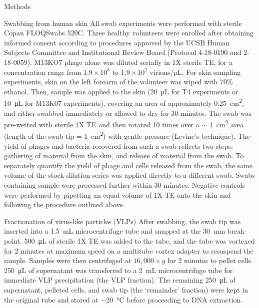 \documentclass[oneside,12pt,final]{sty/ucthesis-CA2012}
\begin{document}
\begin{mainmatter}
\begin{section}{Methods}
\begin{subsection}{Swabbing from human skin}
All swab experiments were performed with sterile Copan FLOQSwabs 520C. Three healthy volunteers were enrolled after obtaining informed consent according to procedures approved by the UCSB Human Subjects Committee and Institutional Review Board (Protocol 4-18-0190 and 2-18-0059). M13KO7 phage alone was diluted serially in 1X sterile TE, for a concentration range from $1.9 \times 10^{8}$ to $1.9 \times 10^{2}$ virions/$\si{\micro\liter}$. For skin sampling experiments, skin on the left forearm of the volunteer was wiped with 70\% ethanol. Then, sample was applied to the skin (\SI{20}{\micro\liter} for T4 experiments or \SI{10} {\micro\liter} for M13K07 experiments), covering an area of approximately \SI{0.25}{\centi\meter\squared}, and either swabbed immediately or allowed to dry for 30 minutes. The swab was pre-wetted with sterile 1X TE and then rotated 10 times over a $\sim$ \SI{1}{\centi\meter\squared} area (length of the swab tip = \SI{1}{\centi\meter\squared}) with gentle pressure (Levine’s technique). The yield of phages and bacteria recovered from such a swab reflects two steps: gathering of material from the skin, and release of material from the swab. To separately quantify the yield of phage and cells released from the swab, the same volume of the stock dilution series was applied directly to a different swab. Swabs containing sample were processed further within 30 minutes. Negative controls were performed by pipetting an equal volume of 1X TE onto the skin and following the procedure outlined above.
\end{subsection}

\begin{subsection}{Fractionation of virus-like particles (VLPs)}
After swabbing, the swab tip was inserted into a \SI{1.5}{\milli\liter} microcentrifuge tube and snapped at the \SI{30}{\milli\meter} break-point. \SI{500}{\micro\liter} of sterile 1X TE was added to the tube, and the tube was vortexed for 2 minutes at maximum speed on a multitube vortex adapter to resuspend the sample. Samples were then centrifuged at $16,000 \times g$ for 2 minutes to pellet cells. \SI{250}{\micro\liter} of supernatant was transferred to a \SI{2}{\mL} microcentrifuge tube for immediate VLP precipitation (the VLP fraction). The remaining \SI{250}{\micro\liter} of supernatant, pelleted cells, and swab tip (the ‘remainder’ fraction) were kept in the original tube and stored at \SI{-20}{\celsius} before proceeding to DNA extraction.
\end{subsection}


\end{section}
\end{mainmatter}
\end{document}

